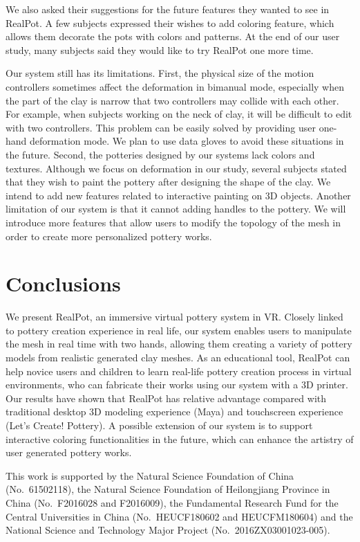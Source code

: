 \documentclass{svjour3}                     %
\begin{document}
We also asked their suggestions for the future features they wanted to see in RealPot.
A few subjects expressed their wishes to add coloring feature, which allows them decorate the pots with colors and patterns.
At the end of our user study, many subjects said they would like to try RealPot one more time.

Our system still has its limitations. First, the physical size of the motion controllers sometimes affect the deformation in bimanual mode, especially when the part of the clay is narrow that two controllers may collide with each other. For example, when subjects working on the neck of clay, it will be difficult to edit with two controllers. This problem can be easily solved by providing user one-hand deformation mode. We plan to use data gloves to avoid these situations in the future.
%
Second, the potteries designed by our systems lack colors and textures. Although we focus on deformation in our study, several subjects stated that they wish to paint the pottery after designing the shape of the clay. We intend to add new features related to interactive painting on 3D objects.
%
Another limitation of our system is that it cannot adding handles to the pottery. We will introduce more features that allow users to modify the topology of the mesh in order to create more personalized pottery works.


\section{Conclusions}
\label{sec:8}

We present RealPot, an immersive virtual pottery system in VR.
Closely linked to pottery creation experience in real life, our system enables users to manipulate the mesh in real time with two hands, allowing them creating a variety of pottery models from realistic generated clay meshes.
As an educational tool, RealPot can help novice users and children to learn real-life pottery creation process in virtual environments, who can fabricate their works using our system with a 3D printer.
Our results have shown that RealPot has relative advantage compared with traditional desktop 3D modeling experience (Maya) and touchscreen experience (Let's Create! Pottery).
A possible extension of our system is to support interactive coloring functionalities in the future, which can enhance the artistry of user generated pottery works.


\begin{acknowledgements}
This work is supported by the Natural Science Foundation of China (No.~61502118), the Natural Science Foundation of Heilongjiang Province in China (No.~F2016028 and F2016009), the Fundamental Research Fund for the Central Universities in China (No.~HEUCF180602 and HEUCFM180604) and the National Science and Technology Major Project (No.~2016ZX03001023-005).
\end{acknowledgements}
\end{document}
